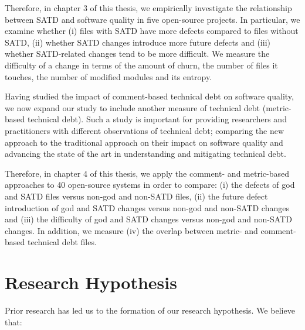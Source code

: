 Therefore, in chapter 3 of this thesis, we empirically investigate the relationship between SATD and software quality in five open-source projects. In particular, we examine whether (i) files with SATD have more defects compared to files without SATD, (ii) whether SATD changes introduce more future defects and (iii) whether SATD-related changes tend to be more difficult. We measure the difficulty of a change in terms of the amount of churn, the number of files it touches, the number of modified modules and its entropy. \par

Having studied the impact of comment-based technical debt on software quality, we now expand our study to include another measure of technical debt (metric-based technical debt). Such a study is important for providing researchers and practitioners with different observations of technical debt; comparing the new approach to the traditional approach on their impact on software quality and advancing the state of the art in understanding and mitigating technical debt.\par


\revision Therefore, in chapter 4 of this thesis, we apply the comment- and metric-based approaches to 40 open-source systems in order to compare: (i) the defects of god and SATD files versus non-god and non-SATD files, (ii) the future defect introduction of god and SATD changes versus non-god and non-SATD changes and (iii) the difficulty of god and SATD changes versus non-god and non-SATD changes. In addition, we measure (iv) the overlap between metric- and comment-based technical debt files.




\section{Research Hypothesis}
Prior research has led us to the formation of our research hypothesis. We believe that:

 

